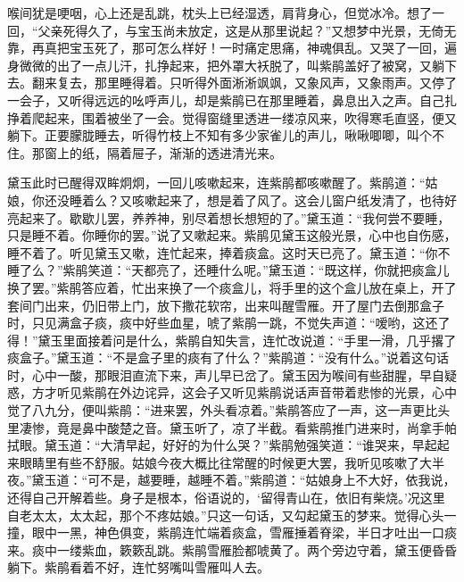 \begin{parag}
    喉间犹是哽咽，心上还是乱跳，枕头上已经湿透，肩背身心，但觉冰冷。想了一回，“父亲死得久了，与宝玉尚未放定，这是从那里说起？”又想梦中光景，无倚无靠，再真把宝玉死了，那可怎么样好！一时痛定思痛，神魂俱乱。又哭了一回，遍身微微的出了一点儿汗，扎挣起来，把外罩大袄脱了，叫紫鹃盖好了被窝，又躺下去。翻来复去，那里睡得着。只听得外面淅淅飒飒，又象风声，又象雨声。又停了一会子，又听得远远的吆呼声儿，却是紫鹃已在那里睡着，鼻息出入之声。自己扎挣着爬起来，围着被坐了一会。觉得窗缝里透进一缕凉风来，吹得寒毛直竖，便又躺下。正要朦胧睡去，听得竹枝上不知有多少家雀儿的声儿，啾啾唧唧，叫个不住。那窗上的纸，隔着屉子，渐渐的透进清光来。
\end{parag}


\begin{parag}
    黛玉此时已醒得双眸炯炯，一回儿咳嗽起来，连紫鹃都咳嗽醒了。紫鹃道：“姑娘，你还没睡着么？又咳嗽起来了，想是着了风了。这会儿窗户纸发清了，也待好亮起来了。歇歇儿罢，养养神，别尽着想长想短的了。”黛玉道：“我何尝不要睡，只是睡不着。你睡你的罢。”说了又嗽起来。紫鹃见黛玉这般光景，心中也自伤感，睡不着了。听见黛玉又嗽，连忙起来，捧着痰盒。这时天已亮了。黛玉道：“你不睡了么？”紫鹃笑道：“天都亮了，还睡什么呢。”黛玉道：“既这样，你就把痰盒儿换了罢。”紫鹃答应着，忙出来换了一个痰盒儿，将手里的这个盒儿放在桌上，开了套间门出来，仍旧带上门，放下撒花软帘，出来叫醒雪雁。开了屋门去倒那盒子时，只见满盒子痰，痰中好些血星，唬了紫鹃一跳，不觉失声道：“嗳哟，这还了得！”黛玉里面接着问是什么，紫鹃自知失言，连忙改说道：“手里一滑，几乎撂了痰盒子。”黛玉道：“不是盒子里的痰有了什么？”紫鹃道：“没有什么。”说着这句话时，心中一酸，那眼泪直流下来，声儿早已岔了。黛玉因为喉间有些甜腥，早自疑惑，方才听见紫鹃在外边诧异，这会子又听见紫鹃说话声音带着悲惨的光景，心中觉了八九分，便叫紫鹃：“进来罢，外头看凉着。”紫鹃答应了一声，这一声更比头里凄惨，竟是鼻中酸楚之音。黛玉听了，凉了半截。看紫鹃推门进来时，尚拿手帕拭眼。黛玉道：“大清早起，好好的为什么哭？”紫鹃勉强笑道：“谁哭来，早起起来眼睛里有些不舒服。姑娘今夜大概比往常醒的时候更大罢，我听见咳嗽了大半夜。”黛玉道：“可不是，越要睡，越睡不着。”紫鹃道：“姑娘身上不大好，依我说，还得自己开解着些。身子是根本，俗语说的，‘留得青山在，依旧有柴烧。’况这里自老太太，太太起，那个不疼姑娘。”只这一句话，又勾起黛玉的梦来。觉得心头一撞，眼中一黑，神色俱变，紫鹃连忙端着痰盒，雪雁捶着脊梁，半日才吐出一口痰来。痰中一缕紫血，簌簌乱跳。紫鹃雪雁脸都唬黄了。两个旁边守着，黛玉便昏昏躺下。紫鹃看着不好，连忙努嘴叫雪雁叫人去。
\end{parag}


